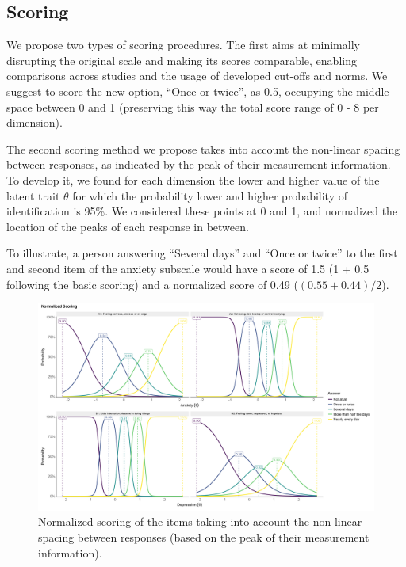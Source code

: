 \documentclass[
  man,floatsintext]{apa6}
\begin{document}
\hypertarget{scoring}{%
\subsection{Scoring}\label{scoring}}

We propose two types of scoring procedures. The first aims at
minimally disrupting the original scale and making its scores comparable, enabling comparisons across studies and the usage of developed cut-offs and norms. We suggest to score the new option, ``Once or twice'', as 0.5, occupying the middle space between 0 and 1 (preserving this way the total score range of 0 - 8 per dimension).

The second scoring method we propose takes into account the non-linear spacing between responses, as indicated by the peak of their measurement information. To develop it, we found for each dimension the lower and higher value of the latent trait \(\theta\) for which the probability lower and higher probability of identification is 95\%. We considered these points at 0 and 1, and normalized the location of the peaks of each response in between.

To illustrate, a person answering ``Several days'' and ``Once or twice'' to the first and second item of the anxiety subscale would have a score of 1.5 (1 + 0.5 following the basic scoring) and a normalized score of 0.49 (\((0.55 + 0.44) / 2\)).

\begin{figure}
\includegraphics[width=1\linewidth]{../figures/figure2} \caption{Normalized scoring of the items taking into account the non-linear spacing between responses (based on the peak of their measurement information).}\label{fig:unnamed-chunk-3}
\end{figure}
\end{document}
